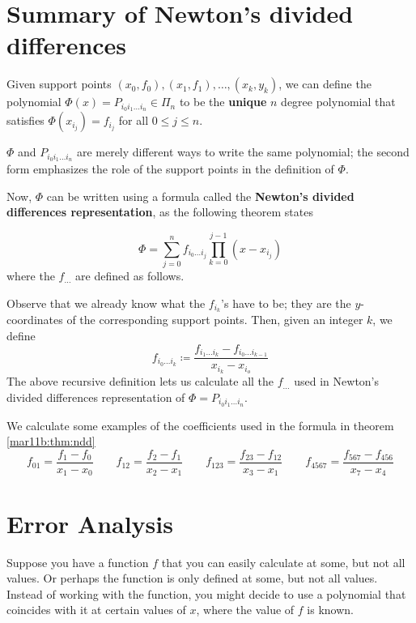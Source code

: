 
\section{Summary of Newton's divided differences}

\begin{defn}
  Given support points $(x_0, f_0), (x_1, f_1), \dots ,(x_k, y_k)$, we can define the polynomial $\Phi(x) = P_{i_0i_1\dots i_n} \in \Pi_n$ to be the \textbf{unique} $n$ degree polynomial that satisfies $\Phi(x_{i_j}) = f_{i_j}$ for all $0 \leq j \leq n$.
\end{defn}
\begin{rmk}
  $\Phi$ and $P_{i_0i_1\dots i_n}$ are merely different ways to write the same polynomial; the second form emphasizes the role of the support points in the definition of $\Phi$.
\end{rmk}

 Now, $\Phi$ can be written using a formula called the \textbf{Newton's divided differences representation}, as the following theorem states
 \begin{thm}
   \label{mar11b:thm:ndd}
  \[
    \Phi = \sum_{j = 0}^n f_{i_0\dots i_j}\prod_{k = 0}^{j-1}\left(x - x_{i_j}\right)
  \]
  where the $f_{\dots}$ are defined as follows.

  Observe that we already know what the $f_{i_k}$'s have to be; they are the $y$-coordinates of the corresponding support points.
  Then, given an integer $k$, we define
  \[
    f_{i_0\dots i_{k}} \coloneqq \frac{f_{i_1\dots i_{k}} - f_{i_0\dots i_{k-1}}}{x_{i_k} - x_{i_o}}
  \]
  The above recursive definition lets us calculate all the $f_{\dots}$ used in Newton's divided differences representation of $\Phi = P_{i_0i_1\dots i_n}$.
\end{thm}

\begin{example}
  We calculate some examples of the coefficients used in the formula in theorem \ref{mar11b:thm:ndd}
  \[
    f_{01} = \frac{f_1 - f_0}{x_1 - x_0}
    \qquad
    f_{12} = \frac{f_2 - f_1}{x_2 - x_1}
    \qquad
    f_{123} = \frac{f_{23} - f_{12}}{x_3 - x_1}
    \qquad
    f_{4567} = \frac{f_{567} - f_{456}}{x_7 - x_4}
  \]
\end{example}

\section{Error Analysis}
Suppose you have a function $f$ that you can easily calculate at some, but not all values. Or perhaps the function is only defined at some, but not all values. Instead of working with the function, you might decide to use a polynomial that coincides with it at certain values of $x$, where the value of $f$ is known.

